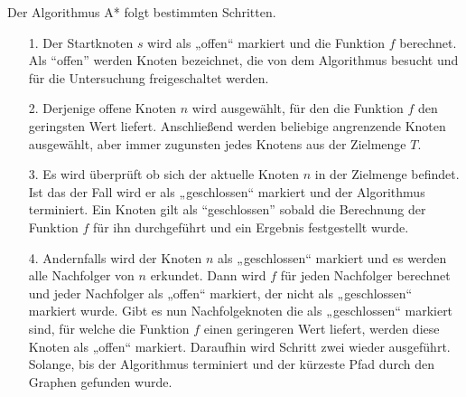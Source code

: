 Der Algorithmus A* folgt bestimmten Schritten. 
\begin{itemize}
\item[1.] Der Startknoten $s$ wird als „offen“ markiert und die Funktion $f$ berechnet. Als “offen” werden Knoten bezeichnet, die von dem Algorithmus besucht und für die Untersuchung freigeschaltet werden.
\item[2.] Derjenige offene Knoten $n$ wird ausgewählt, für den die Funktion $f$ den geringsten Wert liefert. Anschließend werden beliebige angrenzende Knoten ausgewählt, aber immer zugunsten jedes Knotens aus der Zielmenge $T$.
\item[3.] Es wird überprüft ob sich der aktuelle Knoten $n$ in der Zielmenge befindet. Ist das der Fall wird er als „geschlossen“ markiert und der Algorithmus terminiert. Ein Knoten gilt als “geschlossen” sobald die Berechnung der Funktion $f$ für ihn durchgeführt und ein Ergebnis festgestellt wurde. 
\item[4.] Andernfalls wird der Knoten $n$ als „geschlossen“ markiert und es werden alle Nachfolger von $n$ erkundet. Dann wird $f$ für jeden Nachfolger berechnet und jeder Nachfolger als „offen“ markiert, der nicht als „geschlossen“ markiert wurde. Gibt es nun Nachfolgeknoten die als „geschlossen“ markiert sind, für welche die Funktion $f$ einen geringeren Wert liefert, werden diese Knoten als „offen“ markiert. Daraufhin wird Schritt zwei wieder ausgeführt. Solange, bis der Algorithmus terminiert und der kürzeste Pfad durch den Graphen gefunden wurde\cite{HartNilssonandRaphael.1968}.
\end{itemize}


